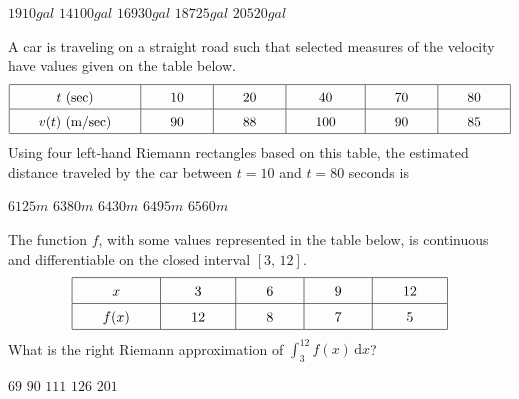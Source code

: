 \begin{questions}
    \begin{oneparchoices}
        \choice $1910 \si{gal}$
        \choice $14100 \si{gal}$
        \choice $16930 \si{gal}$
        \choice $18725 \si{gal}$
        \choice $20520 \si{gal}$
    \end{oneparchoices} \par \horizontalline

    \question A car is traveling on a straight road such that selected measures of the velocity have values given on the table below. \begin{align*}
        \arraycolsep=22pt\def\arraystretch{1.5}
        \begin{array}{|c|c|c|c|c|c|}
            \hline
            t \text{ (sec)} & 10 & 20 & 40 & 70 & 80 \\ \hline
            v(t) \text{ (m/sec)} & 90 & 88 & 100 & 90 & 85 \\
            \hline
        \end{array}
    \end{align*}
    Using four left-hand Riemann rectangles based on this table, the estimated distance traveled by the car between $t = 10$ and $t = 80$ seconds is \\

    \begin{oneparchoices}
        \choice $6125 \si{m}$
        \choice $6380 \si{m}$
        \choice $6430 \si{m}$
        \choice $6495 \si{m}$
        \choice $6560 \si{m}$
    \end{oneparchoices} \par \horizontalline

    \question The function $f$, with some values represented in the table below, is continuous and differentiable on the closed interval $[3, \, 12]$. \begin{align*}
        \arraycolsep=22pt\def\arraystretch{1.5}
        \begin{array}{|c|c|c|c|c|c|}
            \hline
            x & 3 & 6 & 9 & 12 \\ \hline
            f(x) & 12 & 8 & 7 & 5 \\
            \hline
        \end{array}
    \end{align*}
    What is the right Riemann approximation of $\int_3^{12} f(x) \,\mathrm{d}x$? \\

    \begin{oneparchoices}
        \choice $69$
        \choice $90$
        \choice $111$
        \choice $126$
        \choice $201$
    \end{oneparchoices}  \par \horizontalline


\end{questions}
